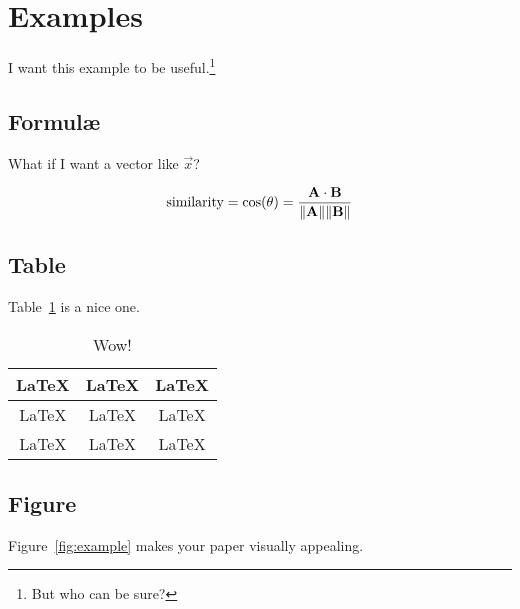\documentclass[a4paper]{article}
\date{}
\begin{document}
\let\newpage\relax\maketitle

\maketitle

\section{Examples}

I want this example to be useful.\footnote{But who can be sure?}

\subsection{Formul\ae}

What if I want a vector like $\vec{x}$?

\begin{equation}
  \text{similarity} = \cos(\theta) = {\mathbf{A} \cdot \mathbf{B} \over \|\mathbf{A}\| \|\mathbf{B}\|}
\end{equation}

\subsection{Table}

Table~\ref{tab:example} is a nice one.

\begin{table}[htbp]
\centering
\caption{\label{tab:example}Wow!}
\begin{tabular}{|c|c|c|}\hline
\LaTeX & \LaTeX & \LaTeX \\\hline
\LaTeX & \LaTeX & \LaTeX \\\hline
\LaTeX & \LaTeX & \LaTeX \\\hline
\end{tabular}
\end{table}

\subsection{Figure}

Figure~\ref{fig:example} makes your paper visually appealing.
\end{document}
